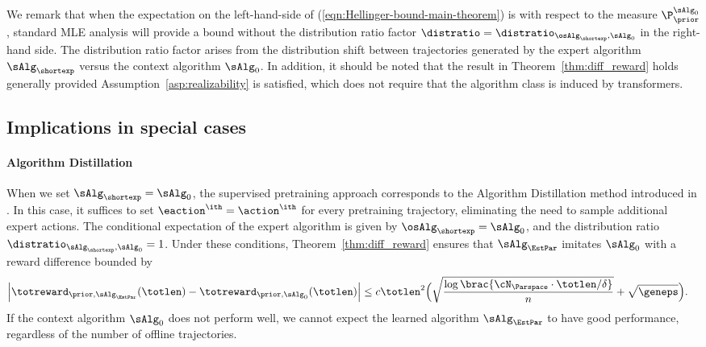 \documentclass[10pt]{article}
\newcommand{\authnote}[2]{{\scriptsize $\ll$\textsf{#1 notes: #2}$\gg$}}
\newcommand{\authnote}[2]{}
\newcommand{\yub}[1]{{\color{red}\authnote{Yu}{#1}}}
\begin{document}
We remark that when the expectation on the left-hand-side of (\ref{eqn:Hellinger-bound-main-theorem}) is with respect to the measure $\P_\prior^{\sAlg_0}$, standard MLE analysis will provide a bound without the distribution ratio factor $\distratio = \distratio_{\osAlg_\shortexp,\sAlg_0}$ in the right-hand side. The distribution ratio factor arises from the distribution shift between trajectories generated by the expert algorithm $\sAlg_\shortexp$ versus the context algorithm $\sAlg_0$.  In addition, it should be noted that the result in Theorem~\ref{thm:diff_reward} holds generally provided Assumption~\ref{asp:realizability} is satisfied, which does not require that the algorithm class is induced by transformers.







\subsection{Implications in special cases}

\paragraph{Algorithm Distillation} When we set $\sAlg_\shortexp = \sAlg_0$, the supervised pretraining approach corresponds to the Algorithm Distillation method introduced in \cite{laskin2022context}. In this case, it suffices to set $\eaction^\ith = \action^\ith$ for every pretraining trajectory, eliminating the need to sample additional expert actions. The conditional expectation of the expert algorithm is given by $\osAlg_\shortexp = \sAlg_0$, and the distribution ratio $\distratio_{\sAlg_\shortexp,\sAlg_0}=1$. Under these conditions, Theorem~\ref{thm:diff_reward} ensures that $\sAlg_\EstPar$ imitates $\sAlg_0$ with a reward difference bounded by
\begin{align*}
\Big|\totreward_{\prior,\sAlg_\EstPar}(\totlen)-\totreward_{\prior,\sAlg_0}(\totlen)\Big|
&\leq c \totlen^2 \Big( \sqrt{\frac{\log \brac{ \cN_{\Parspace} \cdot \totlen/\delta } }{n} } + \sqrt{\geneps} \Big). 
\end{align*}
If the context algorithm $\sAlg_0$ does not perform well, we cannot expect the learned algorithm $\sAlg_\EstPar$ to have good performance, regardless of the number of offline trajectories. 
\end{document}
